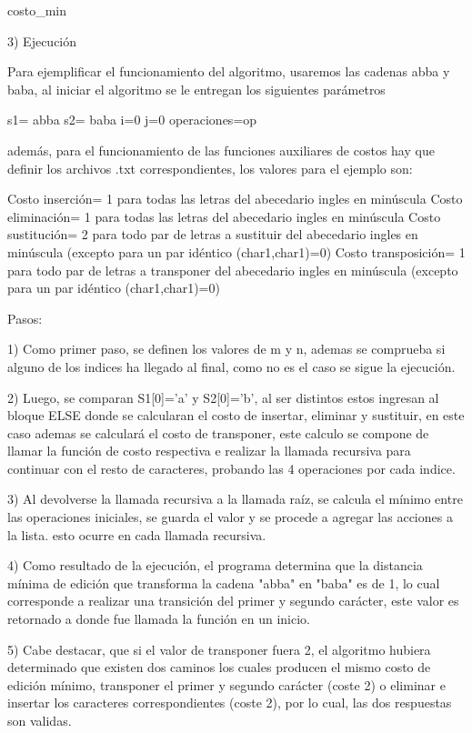 \begin{algorithm}[H]
{        \Return costo\_min\;
    }


\end{algorithm}

3) Ejecución

Para ejemplificar el funcionamiento del algoritmo, usaremos las cadenas
abba y baba, al iniciar el algoritmo se le entregan los siguientes parámetros

s1= abba
s2= baba
i=0
j=0
operaciones=op

además, para el funcionamiento de las funciones auxiliares de costos
hay que definir los archivos .txt correspondientes, los valores para el ejemplo son:


Costo inserción= 1 para todas las letras del abecedario ingles en minúscula
Costo eliminación= 1 para todas las letras del abecedario ingles en minúscula
Costo sustitución= 2 para todo par de letras a sustituir del abecedario ingles en minúscula (excepto para un par idéntico (char1,char1)=0)
Costo transposición= 1 para todo par de letras a transponer del abecedario ingles en minúscula (excepto para un par idéntico (char1,char1)=0)

Pasos:

1) Como primer paso, se definen los valores de m y n, ademas se comprueba si alguno de los 
indices ha llegado al final, como no es el caso se sigue la ejecución.

2) Luego, se comparan S1[0]='a' y S2[0]='b', al ser distintos estos ingresan al bloque ELSE 
donde se calcularan el costo de insertar, eliminar y sustituir, en este caso ademas
se calculará el costo de transponer, este calculo se compone de llamar la función de costo 
respectiva e realizar la llamada recursiva para continuar con el resto de caracteres, 
probando las 4 operaciones por cada indice.

3) Al devolverse la llamada recursiva a la llamada raíz, se calcula el mínimo
entre las operaciones iniciales, se guarda el valor y se procede a agregar las
acciones a la lista. esto ocurre en cada llamada recursiva.

4) Como resultado de la ejecución, el programa determina que la distancia mínima de edición
que transforma la cadena "abba" en "baba" es de 1, lo cual corresponde a realizar una
transición del primer y segundo carácter, este valor es retornado a donde fue llamada
la función en un inicio.

5) Cabe destacar, que si el valor de transponer fuera 2, el 
algoritmo hubiera determinado que existen dos caminos los cuales producen
el mismo costo de edición mínimo, transponer el primer y segundo carácter (coste 2) o
eliminar e insertar los caracteres correspondientes (coste 2), por lo cual, las dos 
respuestas son validas.

